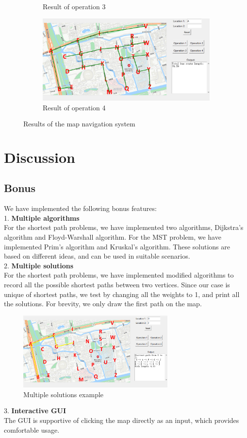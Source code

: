 \documentclass[UTF8]{ctexart}
\begin{document}
\begin{figure}[htbp]
\begin{subfigure}{0.45\textwidth}
    \caption{Result of operation 3}
    \end{subfigure}
    \hfill
    \begin{subfigure}{0.45\textwidth}
        \centering
    \includegraphics[width=\textwidth]{op4.png}
    \caption{Result of operation 4}
    \end{subfigure}%
    \caption{Results of the map navigation system}
\end{figure}


\section{Discussion}

\subsection{Bonus}
We have implemented the following bonus features:\\
1. \textbf{Multiple algorithms}\\
For the shortest path problems, we have implemented two algorithms, Dijkstra's algorithm and Floyd-Warshall algorithm.
For the MST problem, we have implemented Prim's algorithm and Kruskal's algorithm.
These solutions are based on different ideas, and can be used in suitable scenarios.\\
2. \textbf{Multiple solutions}\\
For the shortest path problems, we have implemented modified algorithms to record all the possible shortest paths between two vertices.
Since our case is unique of shortest paths, we test by changing all the weights to 1, and print all the solutions.
For brevity, we only draw the first path on the map.
\begin{figure}[H]
    \centering
    \includegraphics[width=0.7\textwidth]{all.png}
    \caption{Multiple solutions example}
\end{figure}
3. \textbf{Interactive GUI}\\
The GUI is supportive of clicking the map directly as an input, which provides comfortable usage.
\end{document}
